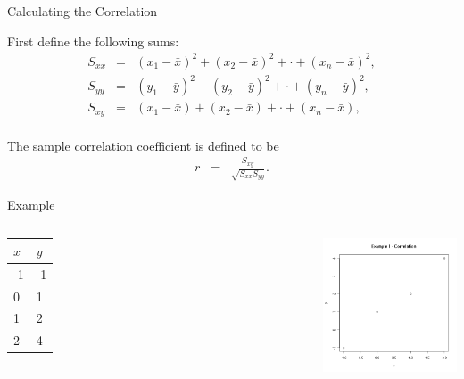 \begin{frame}{Calculating the Correlation}

  First define the following sums:
  \begin{eqnarray*}
    S_{xx} & = & (x_1-\bar{x})^2 + (x_2-\bar{x})^2 + \cdot + (x_n-\bar{x})^2, \\
    S_{yy} & = & (y_1-\bar{y})^2 + (y_2-\bar{y})^2 + \cdot + (y_n-\bar{y})^2, \\
    S_{xy} & = & (x_1-\bar{x}) + (x_2-\bar{x}) + \cdot + (x_n-\bar{x}), \\
  \end{eqnarray*}

  {
    
    \begin{definition}
      The sample correlation coefficient is defined to be
      \begin{eqnarray*}
        r & = & \frac{S_{xy}}{\sqrt{S_{xx} S_{yy}}}.
      \end{eqnarray*}
    \end{definition}

  }
  
\end{frame}



\begin{frame}{Example}
  
  \begin{columns}
    \begin{tabular}{l|l}
      $x$ & $y$ \\ \hline
      -1 & -1 \\
      0 & 1 \\
      1 & 2 \\
      2 & 4
    \end{tabular}

    
    {
      \centerline{\includegraphics[width=6cm]{img/week2-Day3Correlation}}
    }

    \end{columns}

\end{frame}


